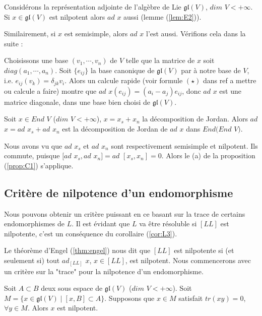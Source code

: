 \documentclass[a4paper,openany,12pt]{report}
\newcommand{\gl}{\mathfrak{gl}}
\theoremstyle{break}
{\theorembodyfont{\upshape}
\newtheorem*{rmq}{Remarque :}
\newtheorem*{prv}{Preuve :}
\newtheorem*{ex}{Exemples :}
\newtheorem{exe}{Exemple : }
\newtheorem*{nota}{Notation :}}
\begin{document}
\begin{ex}
Considérons la représentation adjointe de l'algèbre de Lie $\gl(V)$, $dim$ $V < +\infty$. Si $x \in \gl(V)$ est nilpotent alors $ad$ $x$ aussi (lemme (\ref{lem:E2})).

Similairement, si $x$ est semisimple, alors $ad$ $x$ l'est aussi. Vérifions cela dans la suite : 

Choisissons une base $(v_{1},\cdots,v_{n})$ de $V$ telle que la matrice de $x$ soit $diag(a_{1},\cdots,a_{n})$. Soit $\{ e_{ij} \}$ la base canonique de $\gl(V)$ par à notre base de $V$, i.e. $e_{ij}(v_{k})=\delta_{jk}v_{i}$. Alors un calcule rapide (voir formule $(\star)$ dans ref a mettre ou calcule a faire) montre que $ad$ $x(e_{ij})=(a_{i}-a_{j})e_{ij}$, donc $ad$ $x$ est une matrice diagonale, dans une base bien choisi de $\gl(V)$. 
\end{ex}

\begin{lem}\label{lem:C1}
\quad Soit $x \in End$ $V$ ($dim$ $V < +\infty$), $x=x_{s}+x_{n}$ la décomposition de Jordan. Alors $ad$ $x = ad$ $x_{s}+ad$ $x_{n}$ est la décomposition de Jordan de $ad$ $x$ dans $End(End$ $V)$.
\end{lem}

\begin{prv}
\quad Nous avons vu que $ad$ $x_{s}$ et $ad$ $x_{n}$ sont respectivement semisimple et nilpotent. Ils commute, puisque $[ad$ $x_{s},ad$ $x_{n}] = ad$ $[x_{s},x_{n}]=0$. Alors le (a) de la proposition (\ref{prop:C1}) s'applique.
\end{prv}

\subsection{Critère de nilpotence d'un endomorphisme}\label{a}

\quad Nous pouvons obtenir un critère puissant en ce basant sur la trace de certains endomorphismes de $L$. Il est évidant que $L$ va être résoluble si $[LL]$ est nilpotente, c'est un conséquence du corollaire (\ref{cor:L3}).
 
\quad Le théorème d'Engel (\ref{thm:engel}) nous dit que $[LL]$ est nilpotente si (et seulement si) tout $ad_{[LL]}$ $x$, $x \in [LL]$, est nilpotent. Nous commencerons avec un critère sur la "trace" pour la nilpotence d'un endomorphisme.

\begin{lem}\label{lem:C2}
\quad Soit $A \subset B$ deux sous espace de $\gl(V)$ ($dim$ $V<+\infty$). Soit $M= \{ x \in \gl(V) \mid [x,B] \subset A \}$. Supposons que $x \in M$ satisfait $tr(xy)=0$, $\forall y \in M$.
Alors $x$ est nilpotent. 
\end{lem}
\end{document}
